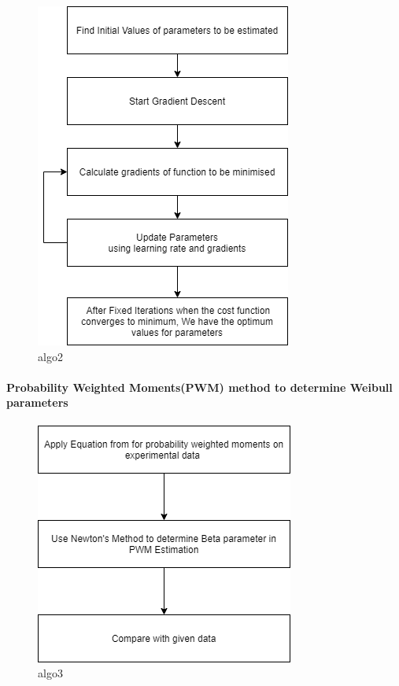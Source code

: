 \documentclass[11pt]{article}
\begin{document}
\begin{figure}
\centering
\includegraphics{images/algo2.png}
\caption{algo2}
\end{figure}

\hypertarget{probability-weighted-momentspwm-method-to-determine-weibull-parameters-1}{%
\paragraph{Probability Weighted Moments(PWM) method to determine Weibull
parameters}\label{probability-weighted-momentspwm-method-to-determine-weibull-parameters-1}}

\begin{figure}
\centering
\includegraphics{images/algo3.png}
\caption{algo3}
\end{figure}
\end{document}
